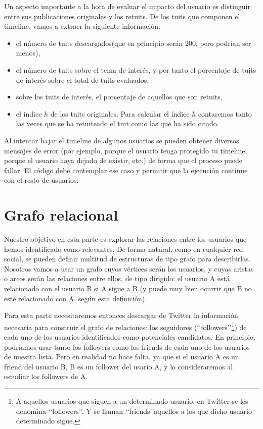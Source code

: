 Un aspecto importante a la hora de evaluar el impacto del usuario es distinguir 
entre sus publicaciones originales y los retuits. De los tuits que componen el 
timeline, vamos a extraer la siguiente información:
\begin{itemize}
\item el número de tuits descargados(que 
en principio serán $200$, pero podrían ser menos),
\item el número de tuits sobre el tema de interés, y por tanto el
porcentaje de tuits de interés sobre el total de tuits evaluados,
\item sobre los tuits de interés, el porcentaje de aquellos que son retuits,
\item el índice $h$ de los tuits originales. Para calcular el índice $h$ 
contaremos tanto las veces que se ha retuiteado el tuit como las que ha sido
citado.
\end{itemize}

Al intentar bajar el timeline de algunos usuarios se pueden
obtener diversos mensajes de error (por ejemplo, porque el usuario tenga
protegido tu timeline, porque el usuario haya dejado de existir, etc.)
de forma que el proceso puede fallar. El código debe contemplar ese
caso y permitir que la ejecución continue con el resto de usuarios:



\section{Grafo relacional}
\label{subsect:grafo}
Nuestro objetivo en esta parte es explorar las relaciones entre los usuarios que 
hemos identificado como relevantes. De forma natural, como en cualquier red social,
se pueden definir multitud de estructuras de tipo grafo para describirlas. Nosotros
vamos a usar un grafo cuyos vértices serán los usuarios, y cuyas aristas o arcos serán
las relaciones entre ellos, de tipo dirigido: el usuario A está relacionado con el
usuario B si A sigue a B (y puede muy bien ocurrir que B no esté relacionado con A,
según esta definición). 

Para esta parte necesitaremos entonces descargar de Twitter la información
necesaria para construir el grafo de relaciones: los seguidores 
(\lq\lq followers\rq\rq\footnote{A aquellos usuarios que siguen a un determinado usuario, 
en Twitter se les denomina \lq\lq followers\rq\rq. Y se llaman \lq\lq friends\rq\rq aquellos
a los que dicho usuario determinado sigue.})
de cada uno de los usuarios identificados como potenciales candidatos. 
En principio, podríamos usar tanto los followers como los friends de cada uno 
de los usuarios de nuestra lista. Pero en realidad no hace falta, ya que si el usuario
A es un friend del usuario B, B es un follower del usario A, y lo consideraremos al
estudiar los followers de A. 

